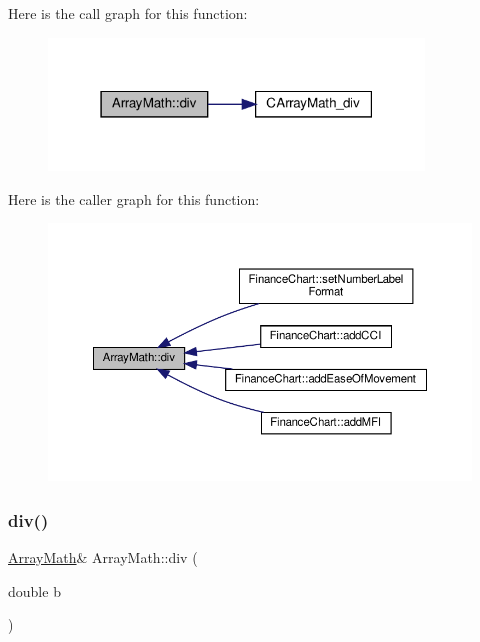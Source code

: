 Here is the call graph for this function\+:
\nopagebreak
\begin{figure}[H]
\begin{center}
\leavevmode
\includegraphics[width=283pt]{class_array_math_a1f2298b0a0338ea48fc3163f6387d11c_cgraph}
\end{center}
\end{figure}
Here is the caller graph for this function\+:
\nopagebreak
\begin{figure}[H]
\begin{center}
\leavevmode
\includegraphics[width=350pt]{class_array_math_a1f2298b0a0338ea48fc3163f6387d11c_icgraph}
\end{center}
\end{figure}
\mbox{\label{class_array_math_a8ba4c3f4ec4a35cc310d97e2a647ad4c}} 
\subsubsection{\texorpdfstring{div()}{div()}\hspace{0.1cm}{\footnotesize\ttfamily [2/2]}}
{\footnotesize\ttfamily \hyperlink{class_array_math}{Array\+Math}\& Array\+Math\+::div (\begin{DoxyParamCaption}\item[{double}]{b }\end{DoxyParamCaption})\hspace{0.3cm}{\ttfamily [inline]}}



